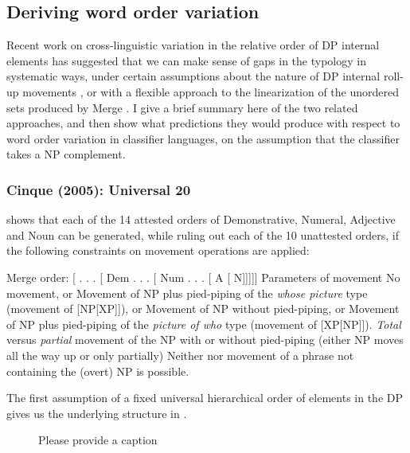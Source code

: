 \documentclass[output=paper
,modfonts
,nonflat]{langsci/langscibook}
\begin{document}
\subsection{Deriving word order variation}

Recent work on cross-linguistic variation in the relative order of DP internal elements has suggested that we can make sense of gaps in the typology in systematic ways, under certain assumptions about the nature of DP internal roll-up movements \citep{Cinque1996,Cinque2005}, or with a flexible approach to the linearization of the unordered sets produced by Merge \citep{AbelsNeeleman2012}. I give a brief summary here of the two related approaches, and then show what predictions they would produce with respect to word order variation in classifier languages, on the assumption that the classifier takes a NP complement. 

\subsubsection{Cinque (2005): Universal 20}
\citet{Cinque2005} shows that each of the 14 attested orders of Demonstrative, Numeral, Adjective and Noun can be generated, while ruling out each of the 10 unattested orders, if the following constraints on movement operations are applied:

\ea \label{ex:hall:55}
\ea Merge order: [ . . . [ Dem . . . [ Num . . . [ A [ N]]]]]
\ex Parameters of movement
\ea No movement, or
\ex Movement of NP plus pied-piping of the \textit{whose picture} type (movement of [NP[XP]]), or  \label{ex:hall:55bii}
\ex Movement of NP without pied-piping, or \label{ex:hall:55biii}
\ex Movement of NP plus pied-piping of the \textit{picture of who} type (movement of [XP[NP]]). \label{ex:hall:55biv}
\ex \textit{Total} versus \textit{partial} movement of the NP with or without pied-piping (either NP moves all the way up or only partially)
\ex Neither  nor movement of a phrase not containing the (overt) NP is possible.
\z
\z
\z

The first assumption of a fixed universal hierarchical order of elements in the DP gives us the underlying structure in .

\begin{figure}
\caption{\color{red}Please provide a caption\label{ex:hall:56}} %
\end{figure}
\end{document}
